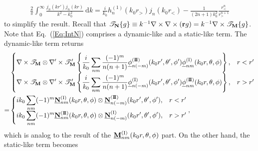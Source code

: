 \documentclass[journal=jacsat,manuscript=article,layout=traditional]{achemso}
\newcommand*\diff{\mathrm{d}}
\newcommand{\norF}[1]{\underline{\vb{#1}}}
\newcommand{\joinR}{\hspace{-.17em}}
\newcommand{\RomanI}{\scriptsize\textrm{I}}
\newcommand{\RomanIII}{\mbox{\RomanI\joinR\RomanI\joinR\RomanI}}
\begin{document}
\begin{align}
    \label{Eq:IntN}
    \frac{2}{\pi}\int_0^\infty \frac{j_n(kr')j_n(kr)}{k^2-k_0^2}
    ~\diff{k}=
    \frac{i}{k_0}h_n^{(1)}(k_0r_>)j_n(k_0r_<)-
    \frac{1}{(2n+1)k_0^2}\frac{r_<^n}{r_>^{n+1}}
\end{align}
to simplify the result.
Recall that $\mathcal{T}_{\vb{N}}\{g\}\equiv k^{-1}\nabla\times\nabla\times(\vb{r}g)=k^{-1}\nabla\times\mathcal{T}_{\vb{M}}\{g\}$.
Note that Eq.~(\ref{Eq:IntN}) comprises a dynamic-like and a static-like term. The dynamic-like term returns
\begin{align}
    \nonumber
    &\begin{cases}
        \displaystyle
        \nabla\times\mathcal{T}_{\vb{M}}\otimes\nabla'\times\mathcal{T}_{\vb{M}}'
        \left\{\frac{i}{k_0}\sum_{nm}\frac{(-1)^m}{n(n+1)}
        \underline{\phi}_{n(-m)}^{(\RomanIII)}(k_0r',\theta',\phi')\underline{\phi}_{nm}^{(\RomanI)}(k_0r,\theta,\phi)\right\}, & r<r'\\
        \displaystyle
        \nabla\times\mathcal{T}_{\vb{M}}\otimes\nabla'\times\mathcal{T}_{\vb{M}}'
        \left\{\frac{i}{k_0}\sum_{nm}\frac{(-1)^m}{n(n+1)}
        \underline{\phi}_{n(-m)}^{(\RomanI)}(k_0r',\theta',\phi')\underline{\phi}_{nm}^{(\RomanIII)}(k_0r,\theta,\phi)\right\}, & r>r'\\
    \end{cases}\\
    =
    &\begin{cases}
    \displaystyle
    ik_0 \sum_{nm}(-1)^m \norF{N}_{nm}^{(\RomanI)}(k_0r,\theta,\phi) \otimes
    \norF{N}_{n(-m)}^{(\RomanIII)}(k_0r',\theta',\phi'),  & r<r'\\
    \displaystyle
    ik_0 \sum_{nm}(-1)^m \norF{N}_{nm}^{(\RomanIII)}(k_0r,\theta,\phi) \otimes
    \norF{N}_{n(-m)}^{(\RomanI)}(k_0r',\theta',\phi'),  & r>r'\\
    \end{cases},
\end{align}
which is analog to the result of the $\norF{M}_{nm}^{(\RomanI)}(k_0r,\theta,\phi)$ part.
On the other hand, the static-like term becomes
\end{document}
